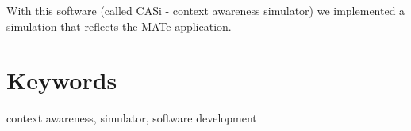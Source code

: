 \documentclass[11pt,    %
  english,ngerman,      %
  paper=a4,             %
  oneside,              %
  tablecaptionbelow,    %
  DIV=calc              %
  ]{scrbook}            %
\begin{document}
With this software (called CASi - context awareness simulator) we implemented a simulation that reflects the MATe application.

\vfill

\section*{Keywords} context awareness, simulator, software development

\clearpage
\setcounter{tocdepth}{1}
\tableofcontents

\mainmatter







%





\end{document}
